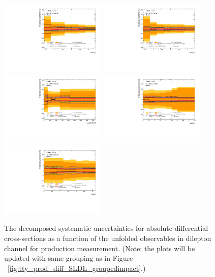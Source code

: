 \begin{figure}[ht]
  \centering
  \includegraphics[width=0.45\textwidth]{figures/diff_xsec/groupedimpact-absolute-xsec/tty_prod_DL/Uncertainty_tty_drphl1.pdf}%
  \includegraphics[width=0.45\textwidth]{figures/diff_xsec/groupedimpact-absolute-xsec/tty_prod_DL/Uncertainty_tty_drphl2.pdf}\\%
  \includegraphics[width=0.45\textwidth]{figures/diff_xsec/groupedimpact-absolute-xsec/tty_prod_DL/Uncertainty_tty_ptll.pdf}%
  \includegraphics[width=0.45\textwidth]{figures/diff_xsec/groupedimpact-absolute-xsec/tty_prod_DL/Uncertainty_tty_dEtall.pdf}\\%
  \includegraphics[width=0.45\textwidth]{figures/diff_xsec/groupedimpact-absolute-xsec/tty_prod_DL/Uncertainty_tty_dPhill.pdf}%
\caption{The decomposed systematic uncertainties for absolute differential cross-sections as a function of the unfolded observables in dilepton channel for \tty production measurement.
 (Note: the plots will be updated with same grouping as in Figure ~\ref{fig:tty_prod_diff_SLDL_groupedimpact}.)}
\label{fig:tty_prod_diff_DL2_groupedimpact}
\end{figure}

